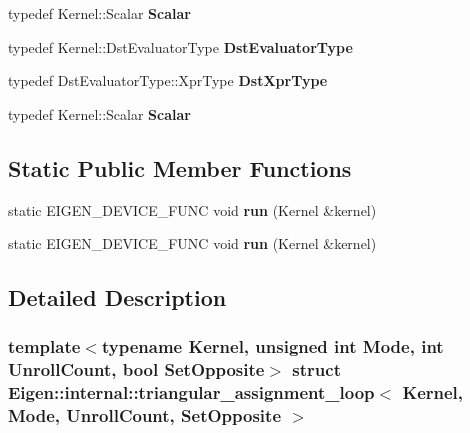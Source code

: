 \begin{DoxyCompactItemize}
typedef Kernel\+::\+Scalar {\bfseries Scalar}
\item 
\mbox{\label{struct_eigen_1_1internal_1_1triangular__assignment__loop_ad3b34b01e072c973b4ae85356f9984a1}} 
typedef Kernel\+::\+Dst\+Evaluator\+Type {\bfseries Dst\+Evaluator\+Type}
\item 
\mbox{\label{struct_eigen_1_1internal_1_1triangular__assignment__loop_ab2f24d7211c8c3c2f3dad07ebfff4848}} 
typedef Dst\+Evaluator\+Type\+::\+Xpr\+Type {\bfseries Dst\+Xpr\+Type}
\item 
\mbox{\label{struct_eigen_1_1internal_1_1triangular__assignment__loop_a47a7999acf8ec526cce8fb63c6c49ab9}} 
typedef Kernel\+::\+Scalar {\bfseries Scalar}
\end{DoxyCompactItemize}
\subsection*{Static Public Member Functions}
\begin{DoxyCompactItemize}
\item 
\mbox{\label{struct_eigen_1_1internal_1_1triangular__assignment__loop_adac5998cbef1f81240d3dfbdc46fa269}} 
static E\+I\+G\+E\+N\+\_\+\+D\+E\+V\+I\+C\+E\+\_\+\+F\+U\+NC void {\bfseries run} (Kernel \&kernel)
\item 
\mbox{\label{struct_eigen_1_1internal_1_1triangular__assignment__loop_adac5998cbef1f81240d3dfbdc46fa269}} 
static E\+I\+G\+E\+N\+\_\+\+D\+E\+V\+I\+C\+E\+\_\+\+F\+U\+NC void {\bfseries run} (Kernel \&kernel)
\end{DoxyCompactItemize}


\subsection{Detailed Description}
\subsubsection*{template$<$typename Kernel, unsigned int Mode, int Unroll\+Count, bool Set\+Opposite$>$\newline
struct Eigen\+::internal\+::triangular\+\_\+assignment\+\_\+loop$<$ Kernel, Mode, Unroll\+Count, Set\+Opposite $>$}



